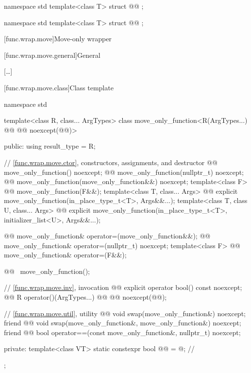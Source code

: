 \begin{addedblock}
\begin{codeblock}
namespace std {
  template<class T>
  struct @@ {};
}
\end{codeblock}

\begin{codeblock}
namespace std {
  template<class T>
  struct @@ {};
}
\end{codeblock}
\end{addedblock}

[func.wrap.move]{Move-only wrapper}

[func.wrap.move.general]{General}

[\ldots]

[func.wrap.move.class]{Class template }

\begin{codeblock}
namespace std {
  template<class R, class... ArgTypes>
  class move_only_function<R(ArgTypes...) @\cv{}@ @@ noexcept(@@)> {
  public:
    using result_type = R;

    // \ref{func.wrap.move.ctor}, constructors, assignments, and destructor
    @@ move_only_function() noexcept;
    @@ move_only_function(nullptr_t) noexcept;
    @@ move_only_function(move_only_function&&) noexcept;
    template<class F> @@ move_only_function(F&&);
    template<class T, class... Args>
      @@ explicit move_only_function(in_place_type_t<T>, Args&&...);
    template<class T, class U, class... Args>
      @@ explicit move_only_function(in_place_type_t<T>, initializer_list<U>, Args&&...);

    @@ move_only_function& operator=(move_only_function&&);
    @@ move_only_function& operator=(nullptr_t) noexcept;
    template<class F> @@ move_only_function& operator=(F&&);

    @@ ~move_only_function();

    // \ref{func.wrap.move.inv}, invocation
    @@ explicit operator bool() const noexcept;
    @@ R operator()(ArgTypes...) @\cv{}@ @@ noexcept(@@);

    // \ref{func.wrap.move.util}, utility
    @@ void swap(move_only_function&) noexcept;
    friend @@ void swap(move_only_function&, move_only_function&) noexcept;
    friend @@ bool operator==(const move_only_function&, nullptr_t) noexcept;

  private:
    template<class VT>
      static constexpr bool @@ = @\seebelow@;       // \expos
  };
}
\end{codeblock}

